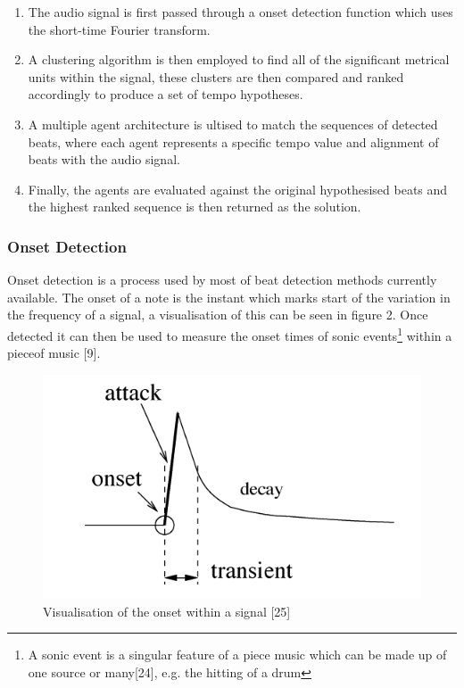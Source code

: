 \documentclass[a4paper, 11pt]{article}
\begin{document}
\begin{enumerate}
\item The audio signal is first passed through a onset detection function which uses the short-time Fourier transform. 
\item A clustering algorithm is then employed to find all of the significant metrical units within the signal, these clusters are then compared and ranked accordingly to produce a set of tempo hypotheses.
\item A multiple agent architecture is ultised to match the sequences of detected beats, where each agent represents a specific tempo value and alignment of beats with the audio signal.
\item Finally, the agents are evaluated against the original hypothesised beats and the highest ranked sequence is then returned as the solution.
\end{enumerate}

\subsubsection{Onset Detection}
Onset detection is a process used by most of beat detection methods currently available. The onset of a note is the instant which marks start of the variation in the frequency of a signal, a visualisation of this can be seen in figure 2. Once detected it can then be used to measure the onset times of sonic events\footnote{A sonic event is a singular feature of a piece music which can be made up of one source or many[24], e.g. the hitting of a drum} within a pieceof music [9].

\begin{figure}[h]
\caption{Visualisation of the onset within a signal [25]}
	\centering
	\includegraphics[scale=0.50]{Onset}
\end{figure}
\end{document}
